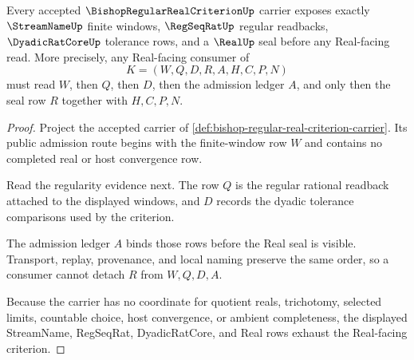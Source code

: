 \begin{theorem}
\label{thm:bishop-regular-real-criterion-human-derivation}
Every accepted $\BishopRegularRealCriterionUp$ carrier exposes exactly $\StreamNameUp$ finite windows, $\RegSeqRatUp$ regular readbacks, $\DyadicRatCoreUp$ tolerance rows, and a $\RealUp$ seal before any Real-facing read. More precisely, any Real-facing consumer of
$$
K=(W,Q,D,R,A,H,C,P,N)
$$
must read $W$, then $Q$, then $D$, then the admission ledger $A$, and only then the seal row $R$ together with $H,C,P,N$.
\end{theorem}
\begin{proof}
Project the accepted carrier of \autoref{def:bishop-regular-real-criterion-carrier}. Its public admission route begins with the finite-window row $W$ and contains no completed real or host convergence row.

Read the regularity evidence next. The row $Q$ is the regular rational readback attached to the displayed windows, and $D$ records the dyadic tolerance comparisons used by the criterion.

The admission ledger $A$ binds those rows before the Real seal is visible. Transport, replay, provenance, and local naming preserve the same order, so a consumer cannot detach $R$ from $W,Q,D,A$.

Because the carrier has no coordinate for quotient reals, trichotomy, selected limits, countable choice, host convergence, or ambient completeness, the displayed StreamName, RegSeqRat, DyadicRatCore, and Real rows exhaust the Real-facing criterion.
\end{proof}




